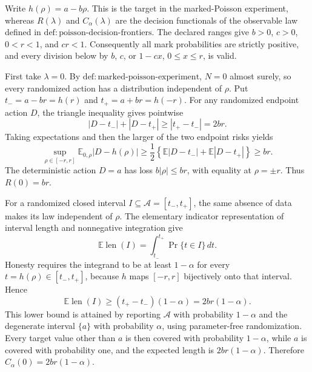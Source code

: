 Write \(h(\rho)=a-b\rho\).  This is the target in the marked-Poisson experiment, whereas \(R(\lambda)\) and \(C_\alpha(\lambda)\) are the decision functionals of the observable law defined in \(\mathrm{def{:}poisson\mbox{-}decision\mbox{-}frontiers}\).  The declared ranges give \(b>0\), \(c>0\), \(0<r<1\), and \(cr<1\).  Consequently all mark probabilities are strictly positive, and every division below by \(b\), \(c\), or \(1-cx\), \(0\leq x\leq r\), is valid.

First take \(\lambda=0\).  By \(\mathrm{def{:}marked\mbox{-}poisson\mbox{-}experiment}\), \(N=0\) almost surely, so every randomized action has a distribution independent of \(\rho\).  Put \(t_-=a-br=h(r)\) and \(t_+=a+br=h(-r)\).  For any randomized endpoint action \(D\), the triangle inequality gives pointwise
\[
 |D-t_-|+|D-t_+|\geq |t_+-t_-|=2br.
\]
Taking expectations and then the larger of the two endpoint risks yields
\[
 \sup_{\rho\in[-r,r]}\mathbb E_{0,\rho}|D-h(\rho)|
 \geq \frac12\left\{\mathbb E|D-t_-|+\mathbb E|D-t_+|\right\}
 \geq br.
\]
The deterministic action \(D=a\) has loss \(b|\rho|\leq br\), with equality at \(\rho=\pm r\).  Thus \(R(0)=br\).

For a randomized closed interval \(I\subseteq\mathcal A=[t_-,t_+]\), the same absence of data makes its law independent of \(\rho\).  The elementary indicator representation of interval length and nonnegative integration give
\[
 \mathbb E\operatorname{len}(I)
 =\int_{t_-}^{t_+}\Pr\{t\in I\}\,dt.
\]
Honesty requires the integrand to be at least \(1-\alpha\) for every \(t=h(\rho)\in[t_-,t_+]\), because \(h\) maps \([-r,r]\) bijectively onto that interval.  Hence
\[
 \mathbb E\operatorname{len}(I)\geq (t_+-t_-)(1-\alpha)=2br(1-\alpha).
\]
This lower bound is attained by reporting \(\mathcal A\) with probability \(1-\alpha\) and the degenerate interval \(\{a\}\) with probability \(\alpha\), using parameter-free randomization.  Every target value other than \(a\) is then covered with probability \(1-\alpha\), while \(a\) is covered with probability one, and the expected length is \(2br(1-\alpha)\).  Therefore \(C_\alpha(0)=2br(1-\alpha)\).


